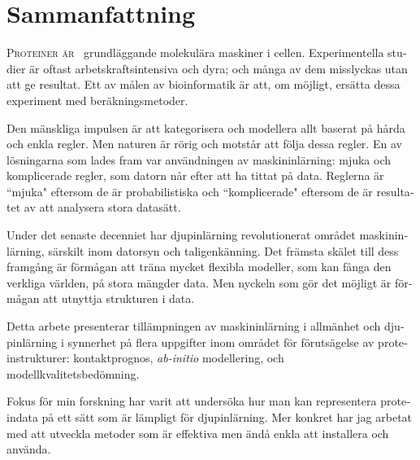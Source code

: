 \chapter*{Sammanfattning}
\begin{otherlanguage}{swedish}
\lettrine[lines=3, lhang=0.15, nindent=0em, findent=2pt]{\color{Maroon}P}{roteiner är\ } grundläggande molekulära maskiner i cellen. Experimentella studier är oftast arbetskraftsintensiva och dyra; och många av dem misslyckas utan att ge resultat. Ett av målen av bioinformatik är att, om möjligt, ersätta dessa experiment med beräkningsmetoder.

Den mänskliga impulsen är att kategorisera och modellera allt baserat på hårda och enkla regler.
Men naturen är rörig och motstår att följa dessa regler.
En av lösningarna som lades fram var användningen av maskininlärning: mjuka och komplicerade regler, som datorn når efter att ha tittat på data.
Reglerna är ``mjuka" eftersom de är probabilistiska och ``komplicerade" eftersom de är resultatet av att analysera stora datasätt.

Under det senaste decenniet har djupinlärning revolutionerat området maskininlärning, särskilt inom datorsyn och taligenkänning. Det främsta skälet till dess framgång är förmågan att träna mycket flexibla modeller, som kan fånga den verkliga världen, på stora mängder data. Men nyckeln som gör det möjligt är förmågan att utnyttja strukturen i data.

Detta arbete presenterar tillämpningen av maskininlärning i allmänhet och djupinlärning i synnerhet på flera uppgifter inom området för förutsägelse av proteinstrukturer: kontaktprognos, \emph{ab-initio} modellering, och modellkvalitetsbedömning.

Fokus för min forskning har varit att undersöka hur man kan representera proteindata på ett sätt som är lämpligt för djupinlärning. Mer konkret har jag arbetat med att utveckla metoder som är effektiva men ändå enkla att installera och använda.
\end{otherlanguage}